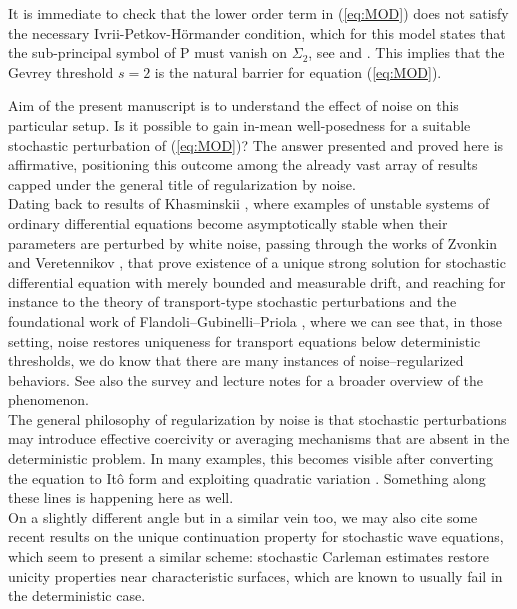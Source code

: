 \documentclass{article}
\begin{document}
It is immediate to check that the lower order term in (\ref{eq:MOD}) does not satisfy
the necessary Ivrii-Petkov-H\"ormander condition, which for this model
states that the sub-principal symbol of $\mathrm{P}$ must vanish on $\Sigma_{2}$, see \cite{MR492751} and \cite{MR427843}. This implies that the Gevrey threshold $ s=2 $ is
the natural barrier for equation (\ref{eq:MOD}).

Aim of the present manuscript is to understand the effect of noise on this particular setup. Is it possible to gain in-mean well-posedness for a suitable stochastic perturbation of (\ref{eq:MOD})? The answer presented and proved here is affirmative,
positioning this outcome among the already vast array of results capped under the general
title of regularization by noise.\\
Dating back to results of  Khasminskii \cite{KHAS}, where examples of unstable systems of
ordinary differential equations become asymptotically stable when their parameters are
perturbed by white noise, passing through the works of Zvonkin \cite{Zvonkin} and Veretennikov \cite{Veretennikov}, that prove existence of a unique strong solution for stochastic differential equation with merely bounded and measurable drift, and reaching for instance to the theory of transport-type stochastic perturbations and the foundational work of Flandoli–Gubinelli–Priola \cite{FGP},
where we can see that, in those setting, noise restores uniqueness for
transport equations below deterministic thresholds, we do know that there are many
instances of noise--regularized behaviors. 
See also the survey \cite{10.1007/978-3-319-74929-7_3} and lecture notes \cite{Flandoli2011} for a broader overview of the phenomenon.\\
The general philosophy of regularization by noise is that stochastic
perturbations may  introduce effective coercivity or averaging mechanisms that are absent in the deterministic problem.
In many examples, this becomes visible after converting the equation
to It\^o form and  exploiting quadratic variation
\cite{FGP}. Something along these lines is happening here as well.\\
On a slightly different angle but in a similar vein too, we may also cite some recent results \cite{lü2026uniquecontinuationpropertystochastic} on
the unique continuation property for stochastic wave equations, which  seem to
present a similar scheme: stochastic Carleman estimates restore
unicity properties near characteristic surfaces, which are known to
usually fail in the deterministic case. 
\end{document}
